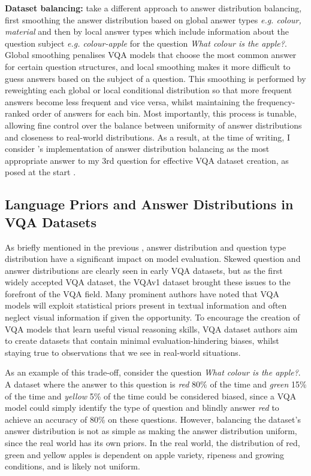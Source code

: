 \textbf{Dataset balancing:} \citeauthor{hudson2019gqa} take a different approach to answer distribution balancing, first smoothing the answer distribution based on global answer types \textit{e.g. colour, material} and then by local answer types which include information about the question subject \textit{e.g. colour-apple} for the question \textit{What colour is the apple?}. Global smoothing penalises VQA models that choose the most common answer for certain question structures, and local smoothing makes it more difficult to guess answers based on the subject of a question. This smoothing is performed by reweighting each global or local conditional distribution so that more frequent answers become less frequent and vice versa, whilst maintaining the frequency-ranked order of answers for each bin. Most importantly, this process is tunable, allowing fine control over the balance between uniformity of answer distributions and closeness to real-world distributions. As a result, at the time of writing, I consider \citeauthor{hudson2019gqa}'s implementation of answer distribution balancing as the most appropriate answer to my 3rd question for effective VQA dataset creation, as posed at the start \sectionautorefname{ \ref{section:vqa_datasets}}.

\subsection{Language Priors and Answer Distributions in VQA Datasets}
\label{subsec:lanauge_priors_in_vqa_datasets}

As briefly mentioned in the previous \subsectionautorefname, answer distribution and question type distribution have a significant impact on model evaluation. Skewed question and answer distributions are clearly seen in early VQA datasets, but as the first widely accepted VQA dataset, the VQAv1 dataset brought these issues to the forefront of the VQA field. Many prominent authors \cite{agrawal2016analyzing, zhang2016yin, kafle2017visual, goyal2017making, johnson2017clevr, agrawal2018dont, hudson2019gqa} have noted that VQA models will exploit statistical priors present in textual information and often neglect visual information if given the opportunity. To encourage the creation of VQA models that learn useful visual reasoning skills, VQA dataset authors aim to create datasets that contain minimal evaluation-hindering biases, whilst staying true to observations that we see in real-world situations.

As an example of this trade-off, consider the question \textit{What colour is the apple?}. A dataset where the answer to this question is \textit{red} 80\% of the time and \textit{green} 15\% of the time and \textit{yellow} 5\% of the time could be considered biased, since a VQA model could simply identify the type of question and blindly answer \textit{red} to achieve an accuracy of 80\% on these questions. However, balancing the dataset's answer distribution is not as simple as making the answer distribution uniform, since the real world has its own priors. In the real world, the distribution of red, green and yellow apples is dependent on apple variety, ripeness and growing conditions, and is likely not uniform.

